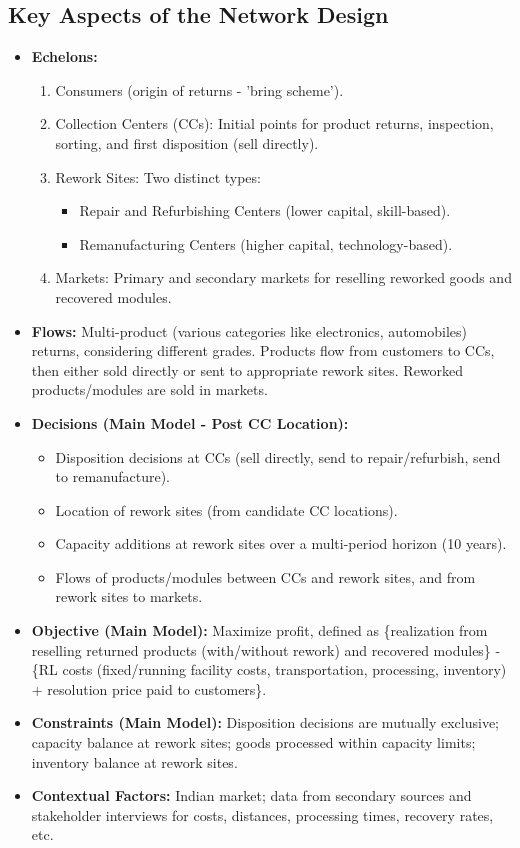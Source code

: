 \subsection*{Key Aspects of the Network Design}
\begin{itemize}
    \item \textbf{Echelons:}
        \begin{enumerate}
            \item Consumers (origin of returns - 'bring scheme').
            \item Collection Centers (CCs): Initial points for product returns, inspection, sorting, and first disposition (sell directly).
            \item Rework Sites: Two distinct types:
                \begin{itemize}
                    \item Repair and Refurbishing Centers (lower capital, skill-based).
                    \item Remanufacturing Centers (higher capital, technology-based).
                \end{itemize}
            \item Markets: Primary and secondary markets for reselling reworked goods and recovered modules.
        \end{enumerate}
    \item \textbf{Flows:} Multi-product (various categories like electronics, automobiles) returns, considering different grades. Products flow from customers to CCs, then either sold directly or sent to appropriate rework sites. Reworked products/modules are sold in markets.
    \item \textbf{Decisions (Main Model - Post CC Location):}
        \begin{itemize}
            \item Disposition decisions at CCs (sell directly, send to repair/refurbish, send to remanufacture).
            \item Location of rework sites (from candidate CC locations).
            \item Capacity additions at rework sites over a multi-period horizon (10 years).
            \item Flows of products/modules between CCs and rework sites, and from rework sites to markets.
        \end{itemize}
    \item \textbf{Objective (Main Model):} Maximize profit, defined as \{realization from reselling returned products (with/without rework) and recovered modules\} - \{RL costs (fixed/running facility costs, transportation, processing, inventory) + resolution price paid to customers\}.
    \item \textbf{Constraints (Main Model):} Disposition decisions are mutually exclusive; capacity balance at rework sites; goods processed within capacity limits; inventory balance at rework sites.
    \item \textbf{Contextual Factors:} Indian market; data from secondary sources and stakeholder interviews for costs, distances, processing times, recovery rates, etc.
\end{itemize}

